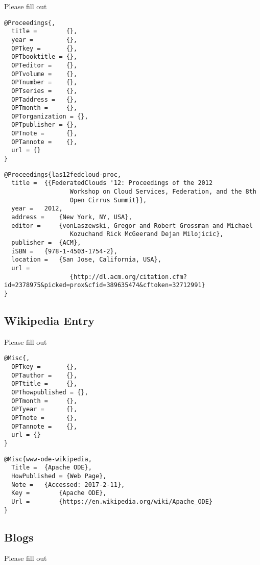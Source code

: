 Please fill out

\begin{verbatim}
@Proceedings{,
  title =        {},
  year =         {},
  OPTkey =       {},
  OPTbooktitle = {},
  OPTeditor =    {},
  OPTvolume =    {},
  OPTnumber =    {},
  OPTseries =    {},
  OPTaddress =   {},
  OPTmonth =     {},
  OPTorganization = {},
  OPTpublisher = {},
  OPTnote =      {},
  OPTannote =    {},
  url = {}
}
\end{verbatim}

\begin{verbatim}
@Proceedings{las12fedcloud-proc,
  title =  {{FederatedClouds '12: Proceedings of the 2012
                  Workshop on Cloud Services, Federation, and the 8th
                  Open Cirrus Summit}},
  year =   2012,
  address =    {New York, NY, USA},
  editor =     {vonLaszewski, Gregor and Robert Grossman and Michael
                  Kozuchand Rick McGeerand Dejan Milojicic},
  publisher =  {ACM},
  iSBN =   {978-1-4503-1754-2},
  location =   {San Jose, California, USA},
  url =
                  {http://dl.acm.org/citation.cfm?id=2378975&picked=prox&cfid=389635474&cftoken=32712991}
}
\end{verbatim}

\subsection{Wikipedia Entry}\label{s:e:wikipedia-entry}

Please fill out

\begin{verbatim}
@Misc{,
  OPTkey =       {},
  OPTauthor =    {},
  OPTtitle =     {},
  OPThowpublished = {},
  OPTmonth =     {},
  OPTyear =      {},
  OPTnote =      {},
  OPTannote =    {},
  url = {}
}
\end{verbatim}

\begin{verbatim}
@Misc{www-ode-wikipedia,
  Title =  {Apache ODE},
  HowPublished = {Web Page},
  Note =   {Accessed: 2017-2-11},
  Key =        {Apache ODE},
  Url =        {https://en.wikipedia.org/wiki/Apache_ODE}
}
\end{verbatim}

\subsection{Blogs}\label{blogs}

Please fill out

